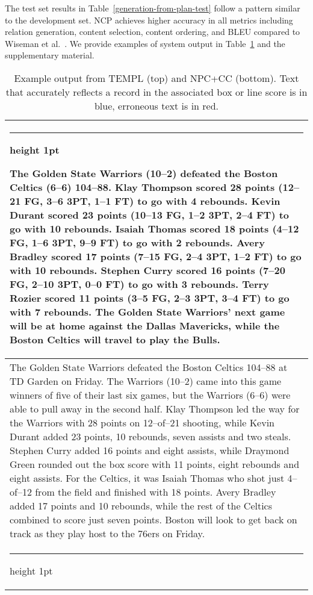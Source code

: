 \documentclass[letterpaper]{article} \usepackage{aaai19}  \usepackage{times}  \usepackage{helvet}  \usepackage{courier}  \usepackage{url}  \usepackage{graphicx}  \frenchspacing  \setlength{\pdfpagewidth}{8.5in}  \setlength{\pdfpageheight}{11in}  \graphicspath{ {images/} }
\makeatletter
\newcommand{\thickhline}{\noalign {\ifnum 0=`}\fi \hrule height 1pt
    \futurelet \reserved@a \@xhline
}
\makeatother
\begin{document}
The test set results in Table~\ref{generation-from-plan-test} follow a
pattern similar to the development set.  NCP achieves higher accuracy
in all metrics including relation generation, content selection,
content ordering, and BLEU compared to Wiseman et
al.~. We provide examples of system
output in Table~\ref{tab:output} and the supplementary material.




\begin{table}[t]
\scriptsize
\centering
\begin{tabular}{@{~}p{8.3cm}@{~}} \thickhline
{\color{blue}The Golden State Warriors (10--2) defeated the
  Boston Celtics (6--6) 104--88. Klay Thompson scored 28 points
  (12--21 FG, 3--6 3PT, 1--1 FT) to go with 4 rebounds. Kevin Durant
  scored 23 points (10--13 FG, 1--2 3PT, 2--4 FT) to go with 10
  rebounds. Isaiah Thomas scored 18 points (4--12 FG, 1--6 3PT, 9--9
  FT) to go with 2 rebounds. Avery Bradley scored 17 points (7--15 FG,
  2--4 3PT, 1--2 FT) to go with 10 rebounds. Stephen Curry  scored 16
  points (7--20 FG, 2--10 3PT, 0--0 FT) to go with 3  rebounds. Terry
  Rozier scored 11 points (3--5 FG, 2--3 3PT, 3--4 FT)  to go with 7
  rebounds.} The Golden State Warriors' next game will be at home
against the Dallas Mavericks, while the Boston Celtics will travel to
play the Bulls. \\ \hline 
{\color{blue}The Golden State Warriors defeated the Boston Celtics 104--88 }at TD Garden on Friday. {\color{blue}The Warriors (10--2)}
came into this game winners of five of their last six games, but the
{\color{red}Warriors (6--6)} were able to pull away in the second half. {\color{blue}Klay Thompson led the way for the Warriors with 28 points on 12--of--21 shooting, while Kevin Durant added 23 points, 10 rebounds, seven assists and two steals. Stephen Curry added 16 points and eight assists, while Draymond Green rounded out the box score with 11 points, eight rebounds and eight assists. For the Celtics, it was Isaiah Thomas who shot just 4--of--12 from the field and finished with 18 points. Avery Bradley added 17 points and 10 rebounds}, while the rest of the Celtics {\color{red}combined to score just seven points}. Boston will look to get back on track as they play host to the 76ers on Friday. \\
\thickhline
\end{tabular}
\caption{\label{tab:output} Example output from TEMPL (top)
  and NPC+CC (bottom). Text that accurately reflects
  a record in the associated box or line score is in {\color{blue}blue}, erroneous text
  is in {\color{red}red.}}
\end{table}
\end{document}
